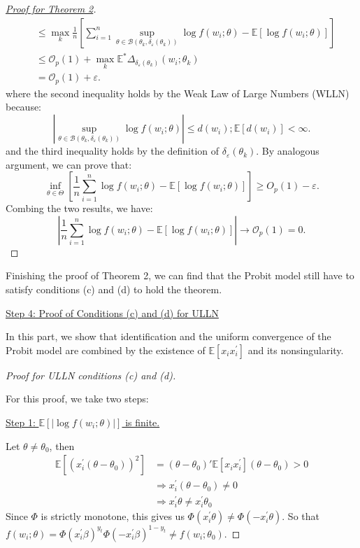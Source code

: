 \documentclass[a4paper,12pt]{article} %
\theoremstyle{nonitalic}
\newenvironment{solution}[1]
  {\renewcommand\theinnercustomsol{#1}\innercustomsol}
  {\endinnercustomsol}
\newcounter{solutionctr}[section]
\renewcommand{\thesolutionctr}{(\alph{solutionctr})}
\newenvironment{autosolution}
  {\stepcounter{solutionctr}\begin{solution}{\thesolutionctr}}
  {\end{solution}}
\begin{document}
\begin{autosolution}
\begin{proof}[\underline{Proof for Theorem 2}]
\begin{align*}
            &\leq \underset{k}{\max} \frac{1}{n} \left[ \sum_{i=1}^{n} \underset{\theta \in \mathcal{B}(\theta_k, \delta_{\varepsilon}(\theta_k))}{\sup} \log f(w_i; \theta) - \mathbb{E}\left[\log f(w_i; \theta)\right] \right] \\
            &\leq \mathcal{O}_p(1) + \underset{k}{\max} \mathbb{E}^*\Delta_{\delta_{\varepsilon}(\theta_k)}(w_i; \theta_k) \\
            &= \mathcal{O}_p(1) + \varepsilon.
        \end{align*}
        where the second inequality holds by the Weak Law of Large Numbers (WLLN)
        because:
        \[
        \left| \underset{\theta \in \mathcal{B}(\theta_k, \delta_{\varepsilon}(\theta_k))}{\sup} \log f(w_i; \theta) \right| \leq d(w_i); \mathbb{E}[d(w_i)] < \infty.
        \]    
        and the third inequality holds by the definition of $\delta_{\varepsilon}(\theta_k)$.
        By analogous argument, we can prove that:
        \[ 
        \underset{\theta \in \Theta}{\inf} \left[ \frac{1}{n} \sum_{i=1}^{n} \log f(w_i; \theta) - \mathbb{E}\left[\log f(w_i; \theta)\right] \right] \geq O_p(1) - \varepsilon.
        \]
        Combing the two results, we have:
        \[
        \left| \frac{1}{n} \sum_{i=1}^{n}\log f(w_i; \theta) - \mathbb{E}[\log f(w_i; \theta)] \right| \to \mathcal{O}_p(1) = 0.
        \]
    \end{proof}
    Finishing the proof of Theorem 2, we can find that the Probit model still have to satisfy conditions (c) and (d) to hold the theorem.

    \underline{Step 4: Proof of Conditions (c) and (d) for ULLN}

    In this part, we show that identification and the uniform convergence of the Probit model are combined by
    the existence of $\mathbb{E}[x_i x_i^{\prime} ]$ and its nonsingularity.
    \begin{proof}[Proof for ULLN conditions (c) and (d)]
        \

        For this proof, we take two steps:

        \underline{Step 1: $\mathbb{E}\left[\left|\log f(w_i; \theta)\right|\right]$ is finite.}

        Let $\theta \neq \theta_0$, then 
        \begin{align*}
            \mathbb{E}\left[\left(x_i^{\prime} (\theta - \theta_0)\right)^2\right] &= (\theta - \theta_0)' \mathbb{E}[x_i x_i^{\prime}] (\theta - \theta_0) > 0 \\
            & \Rightarrow x_i^{\prime} (\theta - \theta_0) \neq 0 \\
            & \Rightarrow x_i^{\prime} \theta \neq x_i^{\prime} \theta_0 
        \end{align*}
        Since $\Phi$ is strictly monotone, this gives us $\Phi (x_i^{\prime} \theta) \neq \Phi(-x_i^{\prime} \theta)$.
        So that $f(w_i; \theta) = \Phi(x_i^{\prime} \beta)^{y_t} \Phi(-x_i^{\prime} \beta)^{1-y_t} \neq f(w_i; \theta_0)$.


\end{proof}
\end{autosolution}
\end{document}
